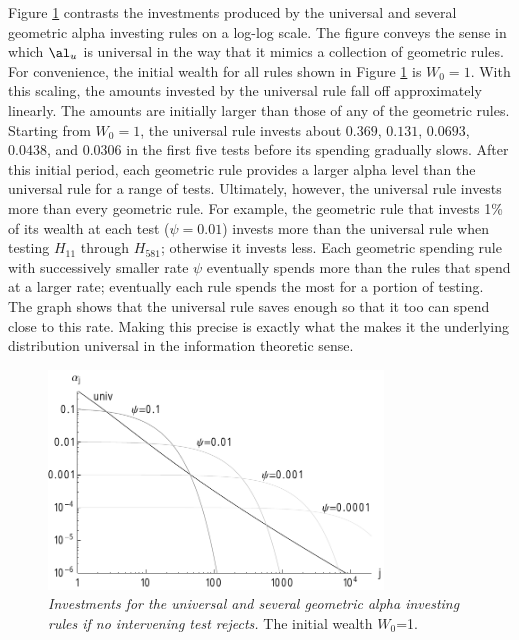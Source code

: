 \documentclass[12pt]{article}
\begin{document}
 
 Figure \ref{fig:rules} contrasts the investments produced by the universal and
 several geometric alpha investing rules on a log-log scale.  The figure conveys
 the sense in which $\al_u$ is universal in the way that it mimics a collection
 of geometric rules.  For convenience, the initial wealth for all rules shown in
 Figure \ref{fig:rules} is $W_0 = 1$.  With this scaling, the amounts invested
 by the universal rule fall off approximately linearly.  The amounts are
 initially larger than those of any of the geometric rules.  Starting from
 $W_0=1$, the universal rule invests about $0.369$, $0.131$, $0.0693$, $0.0438$,
 and $0.0306$ in the first five tests before its spending gradually slows.
  After this initial period, each geometric rule provides a larger alpha level
 than the universal rule for a range of tests.  Ultimately, however, the
 universal rule invests more than every geometric rule.  For example, the
 geometric rule that invests 1\% of its wealth at each test ($\psi=0.01$)
 invests more than the universal rule when testing $H_{11}$ through $H_{581}$;
 otherwise it invests less.  Each geometric spending rule with successively
 smaller rate $\psi$ eventually spends more than the rules that spend at a
 larger rate; eventually each rule spends the most for a portion of testing.
  The graph shows that the universal rule saves enough so that it too can spend
 close to this rate.  Making this precise is exactly what the makes it the
 underlying distribution universal in the information theoretic sense.



 \begin{figure}
 \caption{ \label{fig:rules} { \sl Investments for the universal and several
 geometric alpha investing rules if no intervening test rejects. } The initial
 wealth $W_0$=1. }

 \centerline{
 \vspace{0.1in}
 \includegraphics[width=3.5in]{figures/rules} }
 \vspace{0.2in}
 \end{figure}
\end{document}
